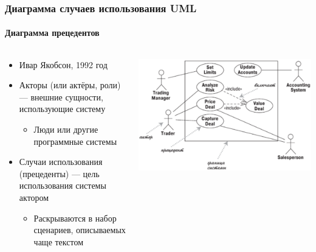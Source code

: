 \documentclass{../../slides-style}
\begin{document}
    \begin{frame}
        \frametitle{Диаграмма случаев использования UML}
        \framesubtitle{Диаграмма прецедентов}
        \begin{columns}
            \begin{column}{0.5\textwidth}
                \begin{itemize}
                    \item Ивар Якобсон, 1992 год
                    \item Акторы (или актёры, роли) --- внешние сущности, использующие систему
                    \begin{itemize}
                        \item Люди или другие программные системы
                    \end{itemize}
                    \item Случаи использования (прецеденты)  --- цель использования системы актором
                    \begin{itemize}
                        \item Раскрываются в набор сценариев, описываемых чаще текстом
                    \end{itemize}
                \end{itemize}
            \end{column}
            \begin{column}{0.5\textwidth}
                \begin{center}
                    \includegraphics[width=\textwidth]{useCaseDiagram.png}
                \end{center}
            \end{column}
        \end{columns}
    \end{frame}
\end{document}
